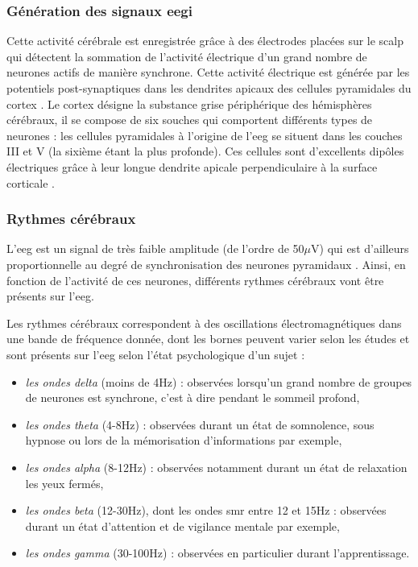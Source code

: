 \subsubsection{Génération des signaux \gls{eegi}}

Cette activité cérébrale est enregistrée grâce à des électrodes placées sur le scalp qui détectent la sommation de l'activité électrique d'un grand nombre de neurones actifs de manière synchrone.
Cette activité électrique est générée par les potentiels post-synaptiques dans les dendrites apicaux des cellules pyramidales du cortex \citep{Hallez2007}. Le cortex désigne 
la substance grise périphérique des hémisphères cérébraux, il se compose de six souches qui comportent différents types de neurones : les cellules pyramidales à l'origine de l'\gls{eeg} 
se situent dans les couches III et V (la sixième étant la plus profonde). Ces cellules sont d'excellents dipôles électriques grâce à leur longue dendrite apicale perpendiculaire 
à la surface corticale \citep{Bekkers2011}. 

\subsubsection{Rythmes cérébraux}

L'\gls{eeg} est un signal de très faible amplitude (de l'ordre de 50$\mu$V) qui est d'ailleurs proportionnelle au degré de synchronisation des neurones pyramidaux \citep{Hallez2007}. 
Ainsi, en fonction de l'activité de ces neurones, différents rythmes cérébraux vont être présents sur l'\gls{eeg}. 

Les rythmes cérébraux correspondent à des oscillations électromagnétiques dans une bande de fréquence donnée, dont les bornes peuvent varier selon les études et sont présents sur l'\gls{eeg}
selon l'état psychologique d'un sujet \citep{Marzbani2016} :  
\begin{itemize}
\item \emph{les ondes delta} (moins de 4Hz) : observées lorsqu'un grand nombre de groupes de neurones est synchrone, c'est à dire pendant le sommeil profond,
\item \emph{les ondes theta} (4-8Hz) : observées durant un état de somnolence, sous hypnose ou lors de la mémorisation d'informations par exemple,
\item \emph{les ondes alpha} (8-12Hz) : observées notamment durant un état de relaxation les yeux fermés,
\item \emph{les ondes beta} (12-30Hz), dont les ondes \gls{smr} entre 12 et 15Hz : observées durant un état d'attention et de vigilance mentale par exemple,
\item \emph{les ondes gamma} (30-100Hz) : observées en particulier durant l'apprentissage.
\end{itemize}

